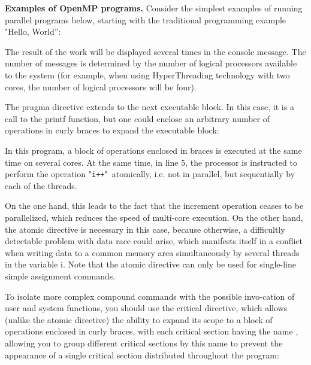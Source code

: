 {	\par\textbf{Examples of OpenMP programs.} Consider the simplest examples of running parallel programs below, starting with the traditional programming example "Hello, World'':
	\begin{figure}[H]
		
	\end{figure}
	\par The result of the work will be displayed several times in the console message. The number of messages is determined by the number of logical processors available to the system (for example, when using HyperThreading technology with two cores, the number of logical processors will be four). 
	\par The pragma directive extends to the next executable block. In this case, it is a call to the printf function, but one could enclose an arbitrary number of operations in curly braces to expand the executable block:
	\begin{figure}[H]
		
	\end{figure}
	In this program, a block of operations enclosed in braces is executed at the same time on several cores. At the same time, in line 5, the processor is instructed to perform the operation "\texttt{i++}"\ atomically, i.e. not in parallel, but sequentially by each of the threads.
	\par On the one hand, this leads to the fact that the increment operation ceases to be parallelized, which reduces the speed of multi-core execution. On the other hand, the atomic directive is necessary in this case, because otherwise, a difficultly detectable problem with data race could arise, which manifests itself in a conflict when writing data to a common memory area simultaneously by several threads in the variable i. Note that the atomic directive can only be used for single-line simple assignment commands.
	\par To isolate more complex compound commands with the possible invo-cation of user and system functions, you should use the critical directive, which allows (unlike the atomic directive) the ability to expand its scope to a block of operations enclosed in curly braces, with each critical section having the name , allowing you to group different critical sections by this name to prevent the appearance of a single critical section distributed throughout the program:
	\begin{figure}[H]
		
	\end{figure}
}
